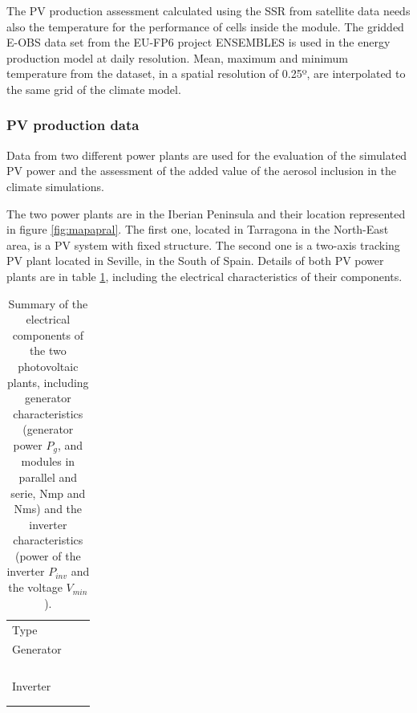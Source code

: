 The PV production assessment calculated using the SSR from satellite data needs also the temperature for the performance of cells inside the module. The gridded E-OBS data set from the EU-FP6 project ENSEMBLES \cite*{Haylock2008} is used in the energy production model at daily resolution. Mean, maximum and minimum temperature from the dataset, in a spatial resolution of 0.25º, are interpolated to the same grid of the climate model. 

\subsubsection{PV production data}

Data from two different power plants are used for the evaluation of the simulated PV power and the assessment of the added value of the aerosol inclusion in the climate simulations.

The two power plants are in the Iberian Peninsula and their location represented in figure \ref{fig:mapapral}. The first one, located in Tarragona in the North-East area, is a PV system with fixed structure. The second one is a two-axis tracking PV plant located in Seville, in the South of Spain. Details of both PV power plants are in table \ref{tabPlants}, including the electrical characteristics of their components. 

\begin{table}[h!]
  \begin{tabular}{>{\raggedright}m{1.5cm}>{\raggedright}m{3cm}>{\raggedright}m{3cm}}
    \toprule 
     & \centering{Seville} & \centering{Tarragona}\tabularnewline
    \midrule
    Type & \centering{two-axes} & \centering{fixed} 
\tabularnewline
    \midrule
    Generator & \centering{$P_{g}=27.31$ $\kilo\wattpeak$}\\ 
                 \centering{$N_{mp}=12$}\\
                 \centering{$N_{ms}=11$} & \centering{$P_g=100.18$ $\kilo\wattpeak$}\\
                               \centering{$N_{mp}=27$}\\
                               \centering{$N_{ms}=35$}
   \tabularnewline
   \midrule
   Inverter & \centering{$P_{inv}=25$ $\kilo\watt$}\\
              \centering{$V_{min}=405$ $\volt$} & \centering{$P_{inv}=100$ $\kilo\wattpeak$}\\
                                \centering{$V_{min}=450$ $\volt$}
    \tabularnewline    
    \bottomrule
  \end{tabular}
  \caption{Summary of the electrical components of the two photovoltaic plants, including generator characteristics (generator power $P_g$, and modules in parallel and serie, Nmp and Nms) and the inverter characteristics (power of the inverter $P_{inv}$ and the voltage $V_{min}$).}
  \label{tabPlants}
\end{table}


